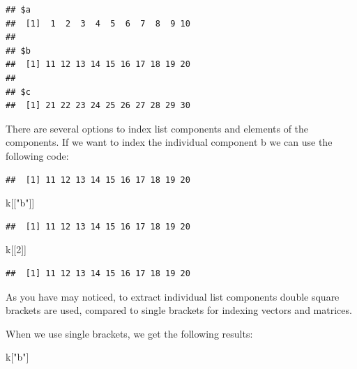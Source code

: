\documentclass[]{book}
\newenvironment{Shaded}{\begin{snugshade}}{\end{snugshade}}
\newcommand{\DecValTok}[1]{\textcolor[rgb]{0.00,0.00,0.81}{#1}}
\newcommand{\StringTok}[1]{\textcolor[rgb]{0.31,0.60,0.02}{#1}}
\newcommand{\OperatorTok}[1]{\textcolor[rgb]{0.81,0.36,0.00}{\textbf{#1}}}
\newcommand{\NormalTok}[1]{#1}
\begin{document}
\begin{verbatim}
## $a
##  [1]  1  2  3  4  5  6  7  8  9 10
## 
## $b
##  [1] 11 12 13 14 15 16 17 18 19 20
## 
## $c
##  [1] 21 22 23 24 25 26 27 28 29 30
\end{verbatim}

There are several options to index list components and elements of the
components. If we want to index the individual component b we can use
the following code:

\begin{Shaded}
\end{Shaded}

\begin{verbatim}
##  [1] 11 12 13 14 15 16 17 18 19 20
\end{verbatim}

\begin{Shaded}
\begin{Highlighting}[]
\NormalTok{k[[}\StringTok{"b"}\NormalTok{]]}
\end{Highlighting}
\end{Shaded}

\begin{verbatim}
##  [1] 11 12 13 14 15 16 17 18 19 20
\end{verbatim}

\begin{Shaded}
\begin{Highlighting}[]
\NormalTok{k[[}\DecValTok{2}\NormalTok{]]}
\end{Highlighting}
\end{Shaded}

\begin{verbatim}
##  [1] 11 12 13 14 15 16 17 18 19 20
\end{verbatim}

As you have may noticed, to extract individual list components double
square brackets are used, compared to single brackets for indexing
vectors and matrices.

When we use single brackets, we get the following results:

\begin{Shaded}
\begin{Highlighting}[]
\NormalTok{k[}\StringTok{"b"}\NormalTok{]}
\end{Highlighting}
\end{Shaded}
\end{document}
